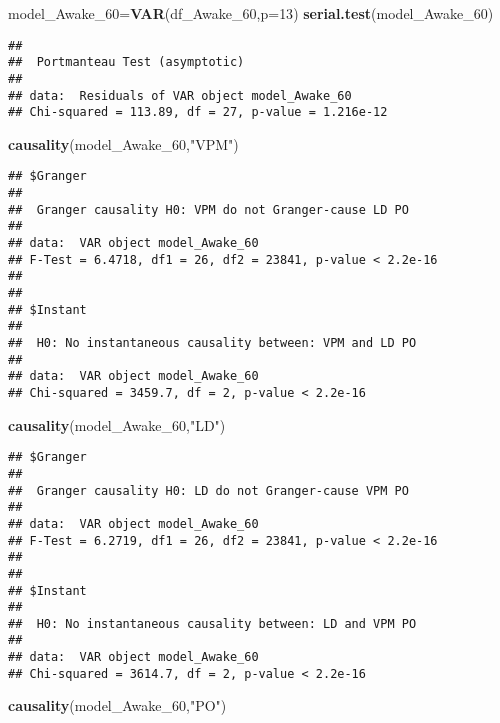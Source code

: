 \documentclass[
]{article}
\newenvironment{Shaded}{\begin{snugshade}}{\end{snugshade}}
\newcommand{\AttributeTok}[1]{\textcolor[rgb]{0.13,0.29,0.53}{#1}}
\newcommand{\DecValTok}[1]{\textcolor[rgb]{0.00,0.00,0.81}{#1}}
\newcommand{\FunctionTok}[1]{\textcolor[rgb]{0.13,0.29,0.53}{\textbf{#1}}}
\newcommand{\NormalTok}[1]{#1}
\newcommand{\OtherTok}[1]{\textcolor[rgb]{0.56,0.35,0.01}{#1}}
\newcommand{\StringTok}[1]{\textcolor[rgb]{0.31,0.60,0.02}{#1}}
\begin{document}
\begin{Shaded}
\begin{Highlighting}[]
\NormalTok{model\_Awake\_60}\OtherTok{=}\FunctionTok{VAR}\NormalTok{(df\_Awake\_60,}\AttributeTok{p=}\DecValTok{13}\NormalTok{)}
\FunctionTok{serial.test}\NormalTok{(model\_Awake\_60)}
\end{Highlighting}
\end{Shaded}

\begin{verbatim}
## 
##  Portmanteau Test (asymptotic)
## 
## data:  Residuals of VAR object model_Awake_60
## Chi-squared = 113.89, df = 27, p-value = 1.216e-12
\end{verbatim}

\begin{Shaded}
\begin{Highlighting}[]
\FunctionTok{causality}\NormalTok{(model\_Awake\_60,}\StringTok{"VPM"}\NormalTok{)}
\end{Highlighting}
\end{Shaded}

\begin{verbatim}
## $Granger
## 
##  Granger causality H0: VPM do not Granger-cause LD PO
## 
## data:  VAR object model_Awake_60
## F-Test = 6.4718, df1 = 26, df2 = 23841, p-value < 2.2e-16
## 
## 
## $Instant
## 
##  H0: No instantaneous causality between: VPM and LD PO
## 
## data:  VAR object model_Awake_60
## Chi-squared = 3459.7, df = 2, p-value < 2.2e-16
\end{verbatim}

\begin{Shaded}
\begin{Highlighting}[]
\FunctionTok{causality}\NormalTok{(model\_Awake\_60,}\StringTok{"LD"}\NormalTok{)}
\end{Highlighting}
\end{Shaded}

\begin{verbatim}
## $Granger
## 
##  Granger causality H0: LD do not Granger-cause VPM PO
## 
## data:  VAR object model_Awake_60
## F-Test = 6.2719, df1 = 26, df2 = 23841, p-value < 2.2e-16
## 
## 
## $Instant
## 
##  H0: No instantaneous causality between: LD and VPM PO
## 
## data:  VAR object model_Awake_60
## Chi-squared = 3614.7, df = 2, p-value < 2.2e-16
\end{verbatim}

\begin{Shaded}
\begin{Highlighting}[]
\FunctionTok{causality}\NormalTok{(model\_Awake\_60,}\StringTok{"PO"}\NormalTok{)}
\end{Highlighting}
\end{Shaded}
\end{document}
